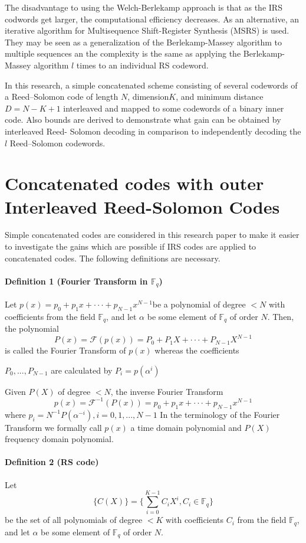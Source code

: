 \documentclass[fontsize=12pt]{article}
\begin{document}
The disadvantage to using the Welch-Berlekamp approach is that as the IRS codwords get larger, the computational efficiency decreases. As an alternative, an iterative algorithm for Multisequence Shift-Register Synthesis (MSRS) is used. They may be seen as a generalization of the Berlekamp-Massey algorithm to multiple sequences an the complexity is the same as applying the  Berlekamp-Massey algorithm $l$ times to an individual RS codeword.

In this research, a simple concatenated scheme consisting of
several codewords of a Reed–Solomon code of length $N$,
dimension$K$, and minimum distance $D=N-K+1$
interleaved and mapped to some codewords of a binary inner
code. Also bounds are derived to
demonstrate what gain can be obtained by interleaved Reed-
Solomon decoding in comparison to independently decoding
the $l$ Reed–Solomon codewords.
\section{Concatenated codes with outer Interleaved Reed-Solomon Codes}
Simple concatenated codes are considered in this research paper to make it easier to investigate the gains which are possible if IRS codes are applied to concatenated codes.
The following definitions are necessary.
\paragraph{Definition 1 (Fourier Transform in $\mathbb{F}_q$)}
Let $p(x)= p_0+p_1x+\cdot\cdot\cdot+p_{N-1}x^{N-1}$be a polynomial of
degree $< N$ with coefficients from the field $\mathbb{F}_q$, and
let $\alpha$ be some element of  $\mathbb{F}_q$ of order $N$. Then, the polynomial
 $$P(x)= \mathscr{F}(p(x))=P_0+P_1X+\cdot\cdot\cdot+P_{N-1}X^{N-1}$$
is called the Fourier Transform of $p(x)$ whereas the coefficients

$P_0,...,P_{N-1}$ are calculated by $P_i=p(\alpha^i)$

Given $P(X)$ of degree $< N$, the inverse Fourier Transform 
  $$p(x)= \mathscr{F}^{-1}(P(x))=p_0+p_1x+\cdot\cdot\cdot+p_{N-1}x^{N-1}$$
 where $p_i=N^{-1}P(\alpha^{-i}), i=0,1,...,N-1$
In the terminology of the Fourier Transform
we formally call $p(x)$ a time domain polynomial and $P(X)$
frequency domain polynomial.

\paragraph{Definition 2 (RS code)}
Let $$\big\{C(X)\big\}=\Big\{ \sum_{i=0}^{K-1} C_iX^i, C_i\in \mathbb{F}_q \Big\}$$
be the set of all polynomials of degree $< K$ with coefficients $C_i$ from the field $\mathbb{F}_q$, and let $\alpha$ be some element of  $\mathbb{F}_q$ of order $N$.
\end{document}
